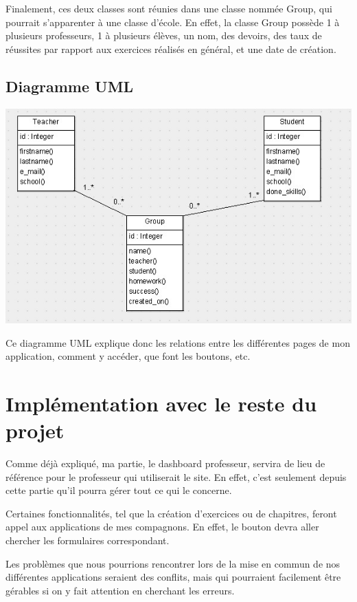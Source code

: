 \documentclass[letterpaper,10pt,french]{sphinxmanual}
\begin{document}
Finalement, ces deux classes sont réunies dans une classe nommée Group, qui
pourrait s'apparenter à une classe d'école. En effet, la classe Group possède
1 à plusieurs professeurs, 1 à plusieurs élèves, un nom, des devoirs, des
taux de réussites par rapport aux exercices réalisés en général, et une date
de création.


\subsection{Diagramme UML}
\label{documentation:diagramme-uml}
\includegraphics{uml.jpg}

Ce diagramme UML explique donc les relations entre les différentes pages de mon
application, comment y accéder, que font les boutons, etc.


\section{Implémentation avec le reste du projet}
\label{documentation:implementation-avec-le-reste-du-projet}
Comme déjà expliqué, ma partie, le dashboard professeur, servira de lieu de
référence pour le professeur qui utiliserait le site. En effet, c'est seulement
depuis cette partie qu'il pourra gérer tout ce qui le concerne.

Certaines fonctionnalités, tel que la création d'exercices ou de chapitres,
feront appel aux applications de mes compagnons. En effet, le bouton devra aller
chercher les formulaires correspondant.

Les problèmes que nous pourrions rencontrer lors de la mise en commun de nos
différentes applications seraient des conflits, mais qui pourraient facilement
être gérables si on y fait attention en cherchant les erreurs.
\end{document}
